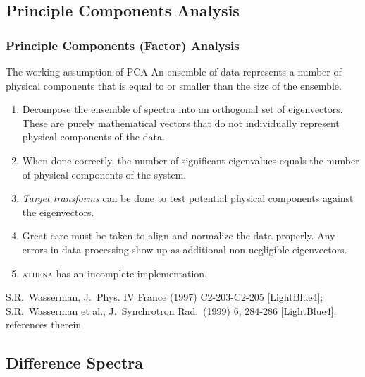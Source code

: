 \documentclass[10pt, xcolor=x11names, compress]{beamer}
\begin{document}
\subsection[PCA]{Principle Components Analysis}

\begin{frame}
  \frametitle{Principle Components (Factor) Analysis}

  \begin{block}{The working assumption of PCA}
    An ensemble of data represents a number of physical components
    that is equal to or smaller than the size of the ensemble.
  \end{block}

  \begin{enumerate}
  \item Decompose the ensemble of spectra into an orthogonal set of
    eigenvectors.  These are purely mathematical vectors that do not
    individually represent physical components of the data.
  \item When done correctly, the number of significant eigenvalues
    equals the number of physical components of the system.
  \item \textit{Target transforms} can be done to test potential
    physical components against the eigenvectors.
  \item Great care must be taken to align and normalize the data
    properly.  Any errors in data processing show up as additional
    non-negligible eigenvectors.
  \item \textsc{athena} has an incomplete implementation.
  \end{enumerate}

  \begin{bottomnote}[0.7][19.25]
    S.R.\ Wasserman, J.\ Phys. IV France (1997) C2-203-C2-205
    [LightBlue4]; S.R.\ Wasserman et al.,
    J.\ Synchrotron Rad.\ (1999) 6, 284-286
    [LightBlue4]; references therein
  \end{bottomnote}
\end{frame}

\subsection[Diff]{Difference Spectra}
\end{document}
